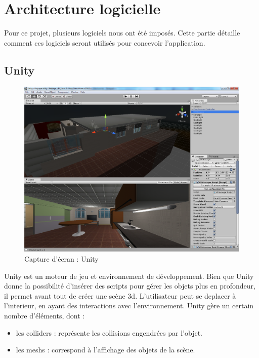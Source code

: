 \section{Architecture logicielle}
Pour ce projet, plusieurs logiciels nous ont été imposés. Cette partie détaille comment ces logiciels seront utilisés pour concevoir l'application.

\subsection{Unity}
\begin{figure}[h]
  \includegraphics[width=1\textwidth]{4-conception/img/unity_screenshot.png}
  \caption{Capture d'écran : Unity}
  \label{unity}
\end{figure}

Unity est un moteur de jeu et environnement de développement. Bien que Unity donne la possibilité d'insérer des scripts pour gérer les objets plus en profondeur, il permet avant tout de créer une scène 3d. L'utilisateur peut se deplacer à l'interieur, en ayant des interactions avec l'environnement. Unity gère un certain nombre d'éléments, dont :
\begin{itemize}
        \item les colliders : représente les collisions engendrées par l'objet.
        \item les meshs : correspond à l'affichage des objets de la scène.
\end{itemize}


